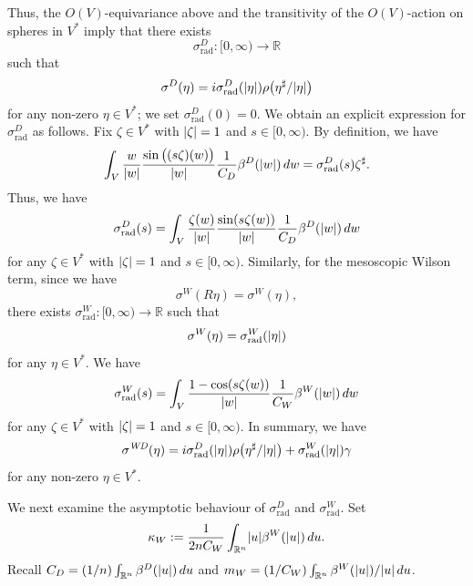 \documentclass[a4paper,oneside,12pt]{amsart}
\theoremstyle{plain}
\theoremstyle{definition}
\theoremstyle{remark}
\newcommand{\R}{\mathbb{R}}
\DeclarePairedDelimiter{\abs}{\lvert}{\rvert}
\newcommand{\cliffordmultiplication}{\rho}
\newcommand{\cutoff}{\beta}
\newcommand{\cutoffDirac}{\cutoff^D}
\newcommand{\cutoffWilson}{\cutoff^W}
\newcommand{\symbolDirac}{\sigma^D}
\newcommand{\symbolWilson}{\sigma^W}
\newcommand{\symbolWilsonDirac}{\sigma^{\mathit{WD}}}
\newcommand{\radialsymbolDirac}{\symbolDirac_{\mathrm{rad}}}
\newcommand{\radialsymbolWilson}{\symbolWilson_{\mathrm{rad}}}
\begin{document}
Thus, the $O(V)$-equivariance above and the transitivity of the $O(V)$-action on spheres in $V^*$ imply that there exists
\begin{equation}
  \radialsymbolDirac \colon [0,\infty) \to \R
\end{equation}
such that
\begin{equation}
  \symbolDirac(\eta) = i \radialsymbolDirac(\abs{\eta}) \cliffordmultiplication \big( \eta^{\sharp}/\abs{\eta} \big)
\end{equation}
for any non-zero $\eta \in V^*$; we set $\radialsymbolDirac(0) = 0$.
We obtain an explicit expression for $\radialsymbolDirac$ as follows.
Fix $\zeta \in V^*$ with $\abs{\zeta} = 1$ and $s \in [0,\infty)$.
By definition, we have
\begin{equation}
  \int_V \frac{w}{\abs{w}} \frac{\sin\big((s\zeta)(w)\big)}{\abs{w}} \frac{1}{C_D} \cutoffDirac(\abs{w}) \,dw = \radialsymbolDirac(s) \zeta^{\sharp}.
\end{equation}
Thus, we have
\begin{equation}
  \radialsymbolDirac(s) = \int_V \frac{\zeta(w)}
  {\abs{w}} \frac{\sin(s\zeta(w))}{\abs{w}} \frac{1}{C_D} \cutoffDirac(\abs{w}) \,dw
\end{equation}
for any $\zeta \in V^*$ with $\abs{\zeta} = 1$ and $s \in [0,\infty)$.
Similarly, for the mesoscopic Wilson term, since we have
\begin{equation}
  \symbolWilson(R\eta) = \symbolWilson(\eta),
\end{equation}
there exists $\radialsymbolWilson \colon [0,\infty) \to \R$ such that
\begin{equation}
  \symbolWilson(\eta) = \radialsymbolWilson(\abs{\eta})
\end{equation}
for any $\eta \in V^*$.
We have
\begin{equation}
  \radialsymbolWilson(s) = \int_V \frac{1 - \cos(s\zeta(w))}{\abs{w}} \frac{1}{C_W} \cutoffWilson(\abs{w}) \,dw
\end{equation}
for any $\zeta \in V^*$ with $\abs{\zeta} = 1$ and $s \in [0,\infty)$.
In summary, we have
\begin{equation}
  \symbolWilsonDirac(\eta) = i \radialsymbolDirac(\abs{\eta}) \cliffordmultiplication\big(\eta^{\sharp}/\abs{\eta}\big) + \radialsymbolWilson(\abs{\eta}) \gamma
\end{equation}
for any non-zero $\eta \in V^*$.

We next examine the asymptotic behaviour of $\radialsymbolDirac$ and $\radialsymbolWilson$.
Set
\begin{equation}
  \kappa_W := \frac{1}{2nC_W}\int_{\R^n} \abs{u} \cutoffWilson(\abs{u}) \,du.
\end{equation}
Recall $C_D = (1/n)\int_{\R^n} \cutoffDirac(\abs{u}) \,du$ and $m_W = (1/C_W) \int_{\R^n} \cutoffWilson(\abs{u})/\abs{u}\,du$.
\end{document}

